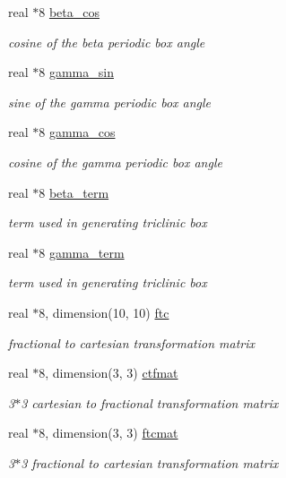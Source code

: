 \begin{DoxyCompactItemize}
real $\ast$8 \hyperlink{classboxes_aee0f306c8bcf447b74d6e054c4696f10}{beta\-\_\-cos}
\begin{DoxyCompactList}\small\item\em cosine of the beta periodic box angle \end{DoxyCompactList}\item 
real $\ast$8 \hyperlink{classboxes_a789f912c3cff1d590a6a9aa6a3073080}{gamma\-\_\-sin}
\begin{DoxyCompactList}\small\item\em sine of the gamma periodic box angle \end{DoxyCompactList}\item 
real $\ast$8 \hyperlink{classboxes_ad5eefe83d23d93b1de5e4370bda74194}{gamma\-\_\-cos}
\begin{DoxyCompactList}\small\item\em cosine of the gamma periodic box angle \end{DoxyCompactList}\item 
real $\ast$8 \hyperlink{classboxes_a6e45e0501eda9170b0c3c2774708b14f}{beta\-\_\-term}
\begin{DoxyCompactList}\small\item\em term used in generating triclinic box \end{DoxyCompactList}\item 
real $\ast$8 \hyperlink{classboxes_ac208c73a5a2e30d60bd4707832bf360a}{gamma\-\_\-term}
\begin{DoxyCompactList}\small\item\em term used in generating triclinic box \end{DoxyCompactList}\item 
real $\ast$8, dimension(10, 10) \hyperlink{classboxes_af71918207c18b840f87869b1c5b465ad}{ftc}
\begin{DoxyCompactList}\small\item\em fractional to cartesian transformation matrix \end{DoxyCompactList}\item 
real $\ast$8, dimension(3, 3) \hyperlink{classboxes_a653e24c554b7b1a243c964602dabfb56}{ctfmat}
\begin{DoxyCompactList}\small\item\em 3$\ast$3 cartesian to fractional transformation matrix \end{DoxyCompactList}\item 
real $\ast$8, dimension(3, 3) \hyperlink{classboxes_a3e2991c39a7c6f6578cdf7a5ee49d1c4}{ftcmat}
\begin{DoxyCompactList}\small\item\em 3$\ast$3 fractional to cartesian transformation matrix \end{DoxyCompactList}\item 

\end{DoxyCompactItemize}
